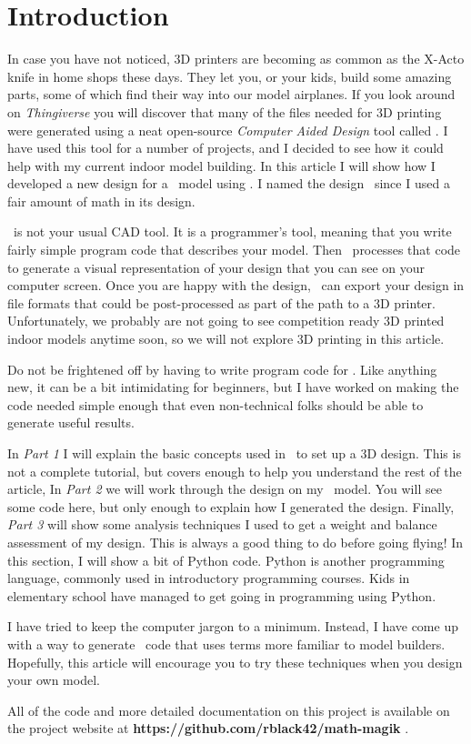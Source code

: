 \section{Introduction}

In case you have not noticed, 3D printers are becoming as common as the X-Acto
knife in home shops these days. They let you, or your kids, build some amazing
parts, some of which find their way into our model airplanes. If you look
around on {\it Thingiverse} \cite{thingy} you will discover that many of the
files needed for 3D printing were generated using a neat open-source {\it
Computer Aided Design} tool called \osc. I have used this tool for a number of
projects, and I decided to see how it could help with my current indoor model
building. In this article I will show how I developed a new design for a \LPP\ model
using \osc. I named the design \MM\ since I used a fair amount of math in its
design.

\osc\ is not your usual CAD tool. It is a programmer's tool, meaning that you
write fairly simple program code that describes your model. Then \osc\ processes
that code to generate a visual representation of your design that you can see on
your computer screen. Once you are happy with the design, \osc\ can export your
design in file formats that could be post-processed as part of the path to a 3D
printer. Unfortunately, we probably are not going to see competition ready 3D
printed indoor models anytime soon, so we will not explore 3D printing in this
article.

Do not be frightened off by having to write program code for \osc. Like
anything new, it can be a bit intimidating for beginners, but I have worked on
making the code needed simple enough that even non-technical folks should be
able to generate useful results.

In {\it Part 1} I will explain the basic concepts used in \osc\ to
set up a 3D design. This is not a complete tutorial, but covers enough to help
you understand the rest of the article, In {\it Part 2} we will work through
the design on my \LPP\ model. You will see some code here, but only enough to
explain how I generated the design. Finally, {\it Part 3} will show some
analysis techniques I used to get a weight and balance assessment of my design.
This is always a good thing to do before going flying! In this section, I will
show a bit of Python code. Python is another programming language, commonly
used in introductory programming courses. Kids in elementary school have
managed to get going in programming using Python.

I have tried to keep the computer jargon to a minimum. Instead, I have come up with
a way to generate \osc\ code that uses terms more familiar to model builders.
Hopefully, this article will encourage you to try these techniques when you
design your own model.

All of the code and more detailed documentation on this project is available on
the project website at {\bf https://github.com/rblack42/math-magik}
\cite{blackr}.


